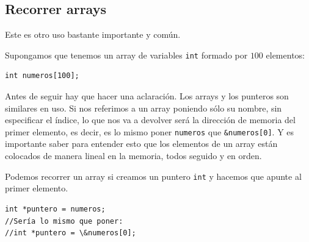 \documentclass{hxc_cl}
\begin{document}
\subsection{Recorrer arrays}

Este es otro uso bastante importante y común.

Supongamos que tenemos un array de variables \texttt{int} formado por $100$ elementos:

\begin{lstlisting}
int numeros[100];
\end{lstlisting}

Antes de seguir hay que hacer una aclaración. Los arrays y los punteros son similares en uso. Si nos referimos a un array poniendo sólo su nombre, sin especificar el índice, lo que nos va a devolver será la dirección de memoria del primer elemento, es decir, es lo mismo poner \texttt{numeros} que \texttt{\&numeros[0]}. Y es importante saber para entender esto que los elementos de un array están colocados de manera lineal en la memoria, todos seguido y en orden.

Podemos recorrer un array si creamos un puntero \texttt{int} y hacemos que apunte al primer elemento.

\begin{lstlisting}
int *puntero = numeros;
//Sería lo mismo que poner:
//int *puntero = \&numeros[0];
\end{lstlisting}
\end{document}
